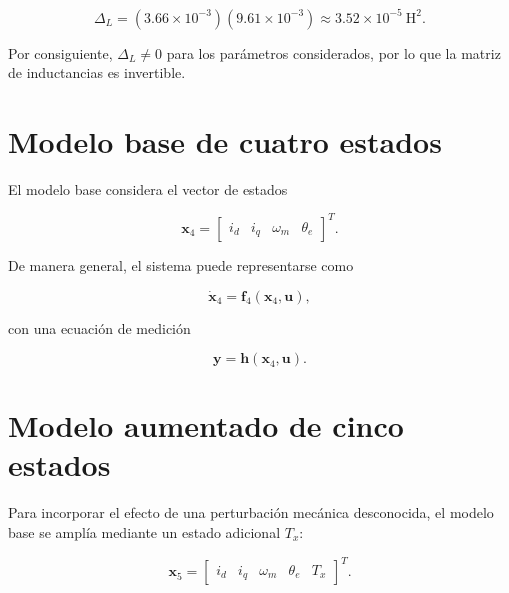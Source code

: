 \begin{equation}
    \Delta_L
    =
    (3.66\times10^{-3})
    (9.61\times10^{-3})
    \approx
    3.52\times10^{-5}~\mathrm{H^2}.
\end{equation}

Por consiguiente, $\Delta_L\neq0$ para los parámetros considerados,
por lo que la matriz de inductancias es invertible.

\section{Modelo base de cuatro estados}
\label{anexo:modelo_4_estados}

El modelo base considera el vector de estados

\begin{equation}
    \mathbf{x}_4 =
    \begin{bmatrix}
        i_d &
        i_q &
        \omega_m &
        \theta_e
    \end{bmatrix}^{T}.
\end{equation}

De manera general, el sistema puede representarse como

\begin{equation}
    \dot{\mathbf{x}}_4 =
    \mathbf{f}_4(\mathbf{x}_4,\mathbf{u}),
\end{equation}

con una ecuación de medición

\begin{equation}
    \mathbf{y} =
    \mathbf{h}(\mathbf{x}_4,\mathbf{u}).
\end{equation}

%


\section{Modelo aumentado de cinco estados}
\label{anexo:modelo_5_estados}

Para incorporar el efecto de una perturbación mecánica desconocida,
el modelo base se amplía mediante un estado adicional $T_x$:

\begin{equation}
    \mathbf{x}_5 =
    \begin{bmatrix}
        i_d &
        i_q &
        \omega_m &
        \theta_e &
        T_x
    \end{bmatrix}^{T}.
\end{equation}

